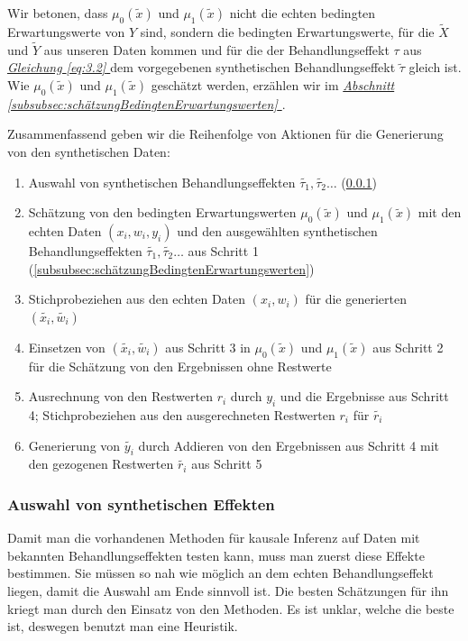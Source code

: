 \documentclass[12pt,a4paper,twoside]{scrartcl}
\numberwithin{equation}{section}
\newcommand{\refsec}[1]{\emph{\hyperref[#1]{Abschnitt \ref*{#1} }}}
\renewcommand*{\refeq}[1]{\emph{\hyperref[#1]{Gleichung \ref*{#1} }}}
\begin{document}
\noindent
Wir betonen, dass $\mu_0(\tilde{x})$ und $\mu_1(\tilde{x})$ nicht die echten bedingten Erwartungswerte von $Y$ sind, sondern die bedingten Erwartungswerte, für die $\widetilde{X}$ und $\widetilde{Y}$ aus unseren Daten kommen und für die der Behandlungseffekt $\tau$ aus \refeq{eq:3.2} dem vorgegebenen synthetischen Behandlungseffekt $\tilde{\tau}$ gleich ist. Wie $\mu_0(\tilde{x})$ und $\mu_1(\tilde{x})$ geschätzt werden, erzählen wir im \refsec{subsubsec:schätzungBedingtenErwartungswerten}.\par 

\noindent
Zusammenfassend geben wir die Reihenfolge von Aktionen für die Generierung von den synthetischen Daten:\par

\begin{enumerate}

\item Auswahl von synthetischen Behandlungseffekten $\tilde{\tau_1},\tilde{\tau_2}\dots$ (\ref{subsubsec:auswahlSynthEffekten}) 

\item Schätzung von den bedingten Erwartungswerten $\mu_0(\tilde{x})$ und $\mu_1(\tilde{x})$ mit den echten Daten $(x_i,w_i,y_i)$ und den ausgewählten synthetischen Behandlungseffekten $\tilde{\tau_1},\tilde{\tau_2}\dots$ aus Schritt 1  (\ref{subsubsec:schätzungBedingtenErwartungswerten})

\item Stichprobeziehen aus den echten Daten $(x_i,w_i)$ für die generierten $(\tilde{x_i},\tilde{w_i})$ 

\item Einsetzen von $(\tilde{x_i},\tilde{w_i})$ aus Schritt 3 in $\mu_0(\tilde{x})$ und $\mu_1(\tilde{x})$ aus Schritt 2 für die Schätzung von den Ergebnissen ohne Restwerte

\item Ausrechnung von den Restwerten $r_i$ durch $y_i$ und die Ergebnisse aus Schritt 4; Stichprobeziehen aus den ausgerechneten Restwerten $r_i$ für $\tilde{r_i}$

\item Generierung von $\tilde{y_i}$ durch Addieren von den Ergebnissen aus Schritt 4 mit den gezogenen Restwerten $\tilde{r_i}$ aus Schritt 5

\end{enumerate}
  		\subsubsection{Auswahl von synthetischen Effekten}\label{subsubsec:auswahlSynthEffekten}
  		Damit man die vorhandenen Methoden für kausale Inferenz auf Daten mit bekannten Behandlungseffekten testen kann, muss man zuerst diese Effekte bestimmen. Sie müssen so nah wie möglich an dem echten Behandlungseffekt liegen, damit die Auswahl am Ende sinnvoll ist. Die besten Schätzungen für ihn kriegt man durch den Einsatz von den Methoden. Es ist unklar, welche die beste ist, deswegen benutzt man eine Heuristik\cite{schuler2017synth}.\par 
  		
\end{document}
